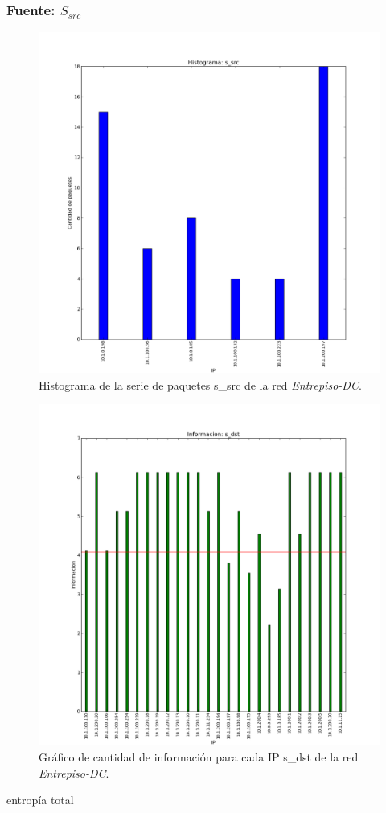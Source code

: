 \documentclass[10pt, a4paper]{article}
\begin{document}
\subsubsection{Fuente: $S_{src}$}

\begin{figure}[H]
  \begin{center}
    \includegraphics[width=0.8\linewidth]{../imgs/entrepiso-dc-ips_s_src_hist.png}
    \caption{Histograma de la serie de paquetes s\_src de la red \emph{Entrepiso-DC}.}
    \label{fig:histograma-entrepiso-dc-s-src}
  \end{center}
\end{figure}
\begin{figure}[H]
  \begin{center}
    \includegraphics[width=0.8\linewidth]{../imgs/entrepiso-dc-ips_s_dst_info.png}
    \caption{Gráfico de cantidad de información para cada IP s\_dst de la red \emph{Entrepiso-DC}.}
    \label{fig:informacion-entrepiso-dc-s-dst}
  \end{center}
\end{figure}
entropía total
\end{document}
